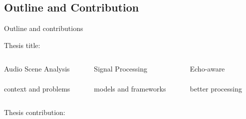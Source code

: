 \subsection*{Outline and Contribution}

\begin{frame}{Outline and contributions}

    \begin{block}{Thesis title:}

        \vspace*{2mm}
        \begin{columns}[onlytextwidth]
            \begin{column}[T]{0.3\linewidth}
                \centering
                \alert{Audio Scene Analysis}
                \\\downarrow
                \\context and problems
            \end{column}\hfill
            \begin{column}[T]{0.3\linewidth}
                \centering
                \alert{Signal Processing}
                \\\downarrow
                \\models and frameworks
            \end{column}\hfill
            \begin{column}[T]{0.3\linewidth}
                \centering
                \alert{Echo-aware}
                \\\downarrow
                \\better processing
            \end{column}\hfill
        \end{columns}
    \end{block}

    \vfill
    \begin{block}{Thesis contribution:}


\end{block}
\end{frame}
